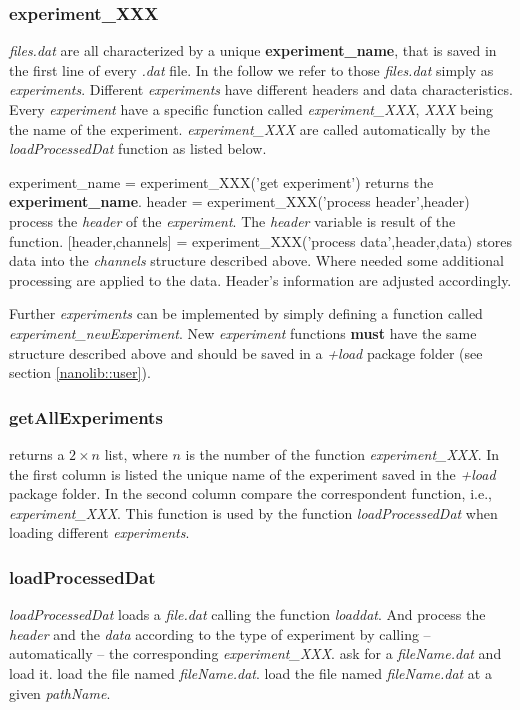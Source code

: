 \subsubsection{experiment\_XXX}
\emph{files.dat} are all characterized by a unique \textbf{experiment\_name}, that is saved in the first line of every \emph{.dat} file.
In the follow we refer to those \emph{files.dat} simply as \emph{experiments}.
Different \emph{experiments} have different headers and data characteristics.
Every \emph{experiment} have a specific function called \emph{experiment\_XXX}, \emph{XXX} being the name of the experiment.
\emph{experiment\_XXX} are called automatically by the \emph{loadProcessedDat} function as listed below.

\bdf
\+ {experiment\_name = experiment\_XXX('get experiment')} returns the \textbf{experiment\_name}.
\+ {header = experiment\_XXX('process header',header)} process the \emph{header} of the \emph{experiment}. 
The \emph{header} variable is result of the function.
\+ {[header,channels] = experiment\_XXX('process data',header,data)} stores data into the \emph{channels} structure described above. Where needed some additional processing are applied to the data. Header's information are adjusted accordingly.
\edf

Further \emph{experiments} can be implemented by simply defining a function called \emph{experiment\_newExperiment}. New \emph{experiment} functions \textbf{must} have the same structure described above and should be saved in a \emph{+load} package folder (see section \ref{nanolib::user}).

\subsubsection{getAllExperiments}
\bdf
{} returns a $2 \times n$ list, where $n$ is the number of the function \emph{experiment\_XXX}.
In the first column is listed the unique name of the experiment saved in the \emph{+load} package folder.
In the second column compare the correspondent function, i.e., \emph{experiment\_XXX}.
\edf
This function is used by the function \emph{loadProcessedDat} when loading different \emph{experiments}.

\subsubsection{loadProcessedDat}
\emph{loadProcessedDat} loads a \emph{file.dat} calling the function \emph{loaddat}.
And process the \emph{header} and the \emph{data} according to the type of experiment by calling -- automatically -- the corresponding \emph{experiment\_XXX}.
\bdf
{} ask for a \emph{fileName.dat} and load it.
 load the file named \emph{fileName.dat}.
 load the file named \emph{fileName.dat} at a given \emph{pathName}.
\edf

